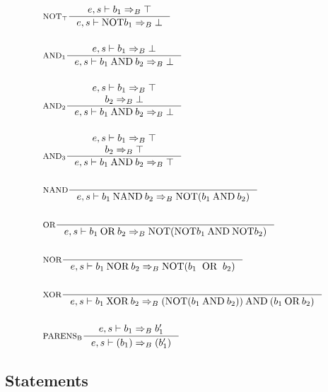 \begin{align*}
&\inference[$\text{NOT}_\top$]{e,s \vdash b_1 \Rightarrow_B \top}
                       {e,s \vdash \Tnot b_1 \Rightarrow_B \bot}
\\\\
&\inference[$\text{AND}_1$]{e,s \vdash b_1 \Rightarrow_B \bot}
                    {e,s \vdash b_1 \Tand b_2 \Rightarrow_B \bot}
\\\\
&\inference[$\text{AND}_2$]{e,s \vdash b_1 \Rightarrow_B \top \\ b_2 \Rightarrow_B \bot}
								    {e,s \vdash b_1 \Tand b_2 \Rightarrow_B \bot}
\\\\
&\inference[$\text{AND}_3$]{e,s \vdash b_1 \Rightarrow_B \top \\ b_2 \Rightarrow_B \top}
								    {e,s \vdash b_1 \Tand b_2 \Rightarrow_B \top}
\\\\
&\inference[NAND]{}
								   {e,s \vdash b_1 \Tnand b_2 \Rightarrow_B \Tnot( b_1 \Tand b_2 )}
\\\\
&\inference[OR]{}
                 {e,s \vdash b_1 \Tor b_2 \Rightarrow_B \Tnot(\Tnot b_1 \Tand \Tnot b_2)}
\\\\
&\inference[NOR]{}
								   {e,s \vdash b_1 \Tnor b_2 \Rightarrow_B \Tnot( b_1 \;\; \textrm{OR} \;\; b_2 )}
\\\\
&\inference[XOR]{}
                  {e,s \vdash b_1 \Txor b_2 \Rightarrow_B (\Tnot(b_1 \Tand b_2)) \Tand (b_1 \Tor b_2)}
\\\\
&\inference[$\text{PARENS}_\text{B}$]{e,s \vdash b_1 \Rightarrow_B b_1'}
                       {e,s \vdash (b_1) \Rightarrow_B (b_1')}
\end{align*}

\subsection{Statements}
